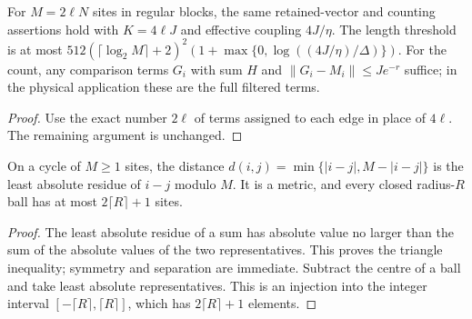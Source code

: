 \begin{lemma}
    \label{thm:hastings_regular_periodic_log_squared}
    \leanok
    For $M=2\ell N$ sites in regular blocks, the same retained-vector
    and counting assertions hold with $K=4\ell J$ and effective coupling
    $4J/\eta$. The length threshold is at most
    $512(\lceil\log_2M\rceil+2)^2
        (1+\max\{0,\log((4J/\eta)/\Delta)\})$.
    For the count, any comparison terms $G_i$ with sum $H$ and
    $\|G_i-M_i\|\le Je^{-r}$ suffice; in the physical application these
    are the full filtered terms.
\end{lemma}
\begin{proof}\leanok
    Use the exact number $2\ell$ of terms assigned to each edge in place
    of $4\ell$. The remaining argument is unchanged.
\end{proof}

\begin{lemma}
    \label{thm:hastings_periodic_physical_metric}
    \leanok
    On a cycle of $M\ge1$ sites, the distance
    $d(i,j)=\min\{|i-j|,M-|i-j|\}$ is the least absolute residue of
    $i-j$ modulo $M$. It is a metric, and every closed radius-$R$ ball
    has at most $2\lceil R\rceil+1$ sites.
\end{lemma}
\begin{proof}\leanok
    The least absolute residue of a sum has absolute value no larger
    than the sum of the absolute values of the two representatives.
    This proves the triangle inequality; symmetry and separation are
    immediate. Subtract the centre of a ball and take least absolute
    representatives. This is an injection into the integer interval
    $[-\lceil R\rceil,\lceil R\rceil]$, which has $2\lceil R\rceil+1$
    elements.
\end{proof}

